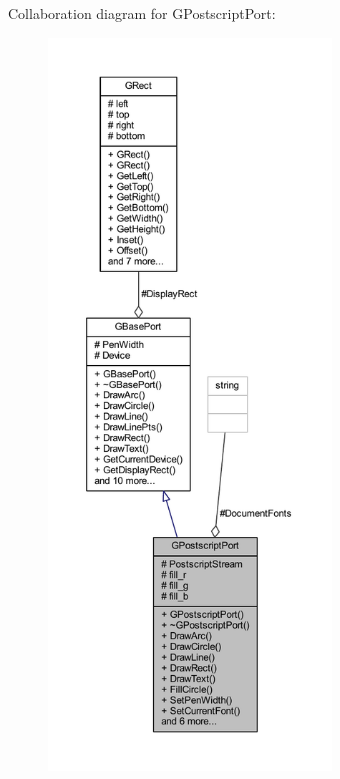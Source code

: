 Collaboration diagram for G\+Postscript\+Port\+:\nopagebreak
\begin{figure}[H]
\begin{center}
\leavevmode
\includegraphics[height=550pt]{class_g_postscript_port__coll__graph}
\end{center}
\end{figure}
